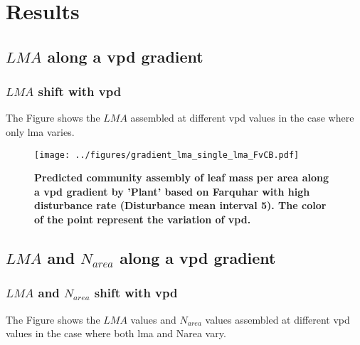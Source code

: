 \documentclass[a4paper,11pt]{article}
\begin{document}
\clearpage

\section{Results}


\subsection{$LMA$ along a vpd gradient}


\subsubsection{$LMA$  shift with vpd}

The Figure \label{fig:lma_vpd} shows the $LMA$ assembled at different
vpd values in the case where only lma varies.

\begin{figure}[H]
\centering
\texttt{[image: ../figures/gradient\_lma\_single\_lma\_FvCB.pdf]}
\caption{\textbf{Predicted community assembly of leaf mass per area along a vpd gradient by 'Plant' based on Farquhar with high disturbance rate (Disturbance mean interval 5). The color of the point represent the variation of vpd.}
\label{fig:lma_vpd}}
\end{figure}

\pagebreak[3]

\subsection{$LMA$ and $N_{area}$ along a vpd gradient}

\subsubsection{$LMA$ and $N_{area}$ shift with vpd}

The Figure \label{fig:lma_nareaFh2} shows the $LMA$ values and $N_{area}$ values assembled at different
vpd values in the case where both lma and Narea vary.


\end{document}
